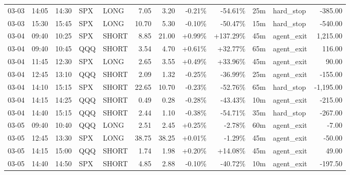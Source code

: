 \documentclass[11pt,a4paper,twoside]{article}
\begin{document}
\begin{center}
\begin{longtable}{>{\color{txtmain}}l l l l l r r r r r >{\color{txtmain}}l r}
03-03 & 14:05 & 14:30 & SPX & LONG & 7.05 & 3.20 & \textcolor{lossred}{-0.21\%} & \textcolor{lossred}{-54.61\%} & 25m & hard\_stop & \textcolor{lossred}{-385.00} \\
03-03 & 15:30 & 15:45 & SPX & LONG & 10.70 & 5.30 & \textcolor{lossred}{-0.10\%} & \textcolor{lossred}{-50.47\%} & 15m & hard\_stop & \textcolor{lossred}{-540.00} \\
03-04 & 09:40 & 10:25 & SPX & SHORT & 8.85 & 21.00 & \textcolor{wingreen}{+0.99\%} & \textcolor{wingreen}{+137.29\%} & 45m & agent\_exit & \textcolor{wingreen}{1,215.00} \\
03-04 & 09:40 & 10:45 & QQQ & SHORT & 3.54 & 4.70 & \textcolor{wingreen}{+0.61\%} & \textcolor{wingreen}{+32.77\%} & 65m & agent\_exit & \textcolor{wingreen}{116.00} \\
03-04 & 11:45 & 12:30 & SPX & LONG & 2.65 & 3.55 & \textcolor{wingreen}{+0.49\%} & \textcolor{wingreen}{+33.96\%} & 45m & agent\_exit & \textcolor{wingreen}{90.00} \\
03-04 & 12:45 & 13:10 & QQQ & SHORT & 2.09 & 1.32 & \textcolor{lossred}{-0.25\%} & \textcolor{lossred}{-36.99\%} & 25m & agent\_exit & \textcolor{lossred}{-155.00} \\
03-04 & 14:10 & 15:15 & SPX & SHORT & 22.65 & 10.70 & \textcolor{lossred}{-0.23\%} & \textcolor{lossred}{-52.76\%} & 65m & hard\_stop & \textcolor{lossred}{-1,195.00} \\
03-04 & 14:15 & 14:25 & QQQ & SHORT & 0.49 & 0.28 & \textcolor{lossred}{-0.28\%} & \textcolor{lossred}{-43.43\%} & 10m & agent\_exit & \textcolor{lossred}{-215.00} \\
03-04 & 14:40 & 15:15 & QQQ & SHORT & 2.44 & 1.10 & \textcolor{lossred}{-0.38\%} & \textcolor{lossred}{-54.71\%} & 35m & hard\_stop & \textcolor{lossred}{-267.00} \\
03-05 & 09:40 & 10:40 & QQQ & LONG & 2.51 & 2.45 & \textcolor{wingreen}{+0.25\%} & \textcolor{lossred}{-2.78\%} & 60m & agent\_exit & \textcolor{lossred}{-7.00} \\
03-05 & 12:45 & 13:30 & SPX & LONG & 38.75 & 38.25 & \textcolor{wingreen}{+0.01\%} & \textcolor{lossred}{-1.29\%} & 45m & agent\_exit & \textcolor{lossred}{-50.00} \\
03-05 & 14:15 & 15:00 & QQQ & SHORT & 1.74 & 1.98 & \textcolor{wingreen}{+0.20\%} & \textcolor{wingreen}{+14.08\%} & 45m & agent\_exit & \textcolor{wingreen}{49.00} \\
03-05 & 14:40 & 14:50 & SPX & SHORT & 4.85 & 2.88 & \textcolor{lossred}{-0.10\%} & \textcolor{lossred}{-40.72\%} & 10m & agent\_exit & \textcolor{lossred}{-197.50} \\

\end{longtable}
\end{center}
\end{document}
